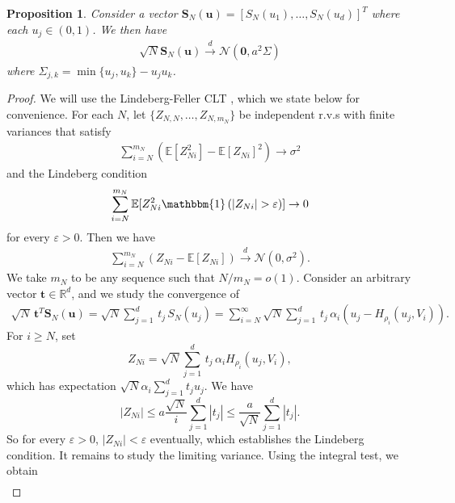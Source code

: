 \documentclass[11pt,a4paper]{article}
\newtheorem{prop}{Proposition}
\newcommand{\E}{\mathbb{E}}
\begin{document}
\begin{appendices}
\begin{prop}\label{app:prop_marginal}
    Consider a vector $\mathbf{S}_N(\mathbf{u}) = [S_N(u_1),\ldots,S_N(u_d)]^T$ where each $u_j \in (0,1)$. We then have
\begin{align*}
    \sqrt{N} \mathbf{S}_N(\mathbf{u}) \overset{d}{\to} \mathcal{N}(\mathbf{0}, a^2 \Sigma)
\end{align*}
where $   \Sigma_{j,k} = \min\{u_j,u_k\} - u_j u_k$.
\end{prop}
\begin{proof}
We will use the Lindeberg-Feller CLT \cite[Proposition 2.27]{vanderVaart2000}, which we state below for convenience. For each $N$, let $\{Z_{N,N},\ldots,Z_{N,m_{N}}\}$ be independent r.v.s with finite variances that satisfy
\begin{align*}
    \sum_{i=N}^{m_{N}} \left(\E[Z_{Ni}^2]-\E[Z_{Ni}]^2\right) \to \sigma^2
\end{align*}
and the Lindeberg condition
\begin{align*}
    \sum_{i=N}^{m_{N}}\E[Z_{Ni}^2 \mathbbm{1}\left(|Z_{Ni} | > \varepsilon\right)] \to 0
\end{align*}
for every $\varepsilon > 0$. Then we have
\begin{align*}
    \sum_{i=N}^{m_{N}}(Z_{Ni} -\E[Z_{Ni}]) \overset{d}{\to} \mathcal{N}(0,\sigma^2).
\end{align*}
We take $m_{N}$ to be any sequence such that $N/m_{N} = o(1)$. Consider an arbitrary vector $\mathbf{t} \in \mathbb{R}^{d}$, and we study the convergence of
\begin{align*}
    \sqrt{N}\, \mathbf{t}^T \mathbf{S}_N(\mathbf{u})  = \sqrt{N}\sum_{j=1}^d \, t_j \, S_N(u_j) = \sum_{i=N}^{\infty}\sqrt{N}\sum_{j=1}^d \, t_j \, \alpha_i(u_{j} - H_{\rho_i}(u_{j},V_i)).
\end{align*}
For $i \geq N$, set
\begin{equation*}
    Z_{Ni} = \sqrt{N}\sum_{j=1}^d \, t_j \, \alpha_i H_{\rho_i}(u_{j},V_i),
\end{equation*}
which has expectation $\sqrt{N}\alpha_{i}\sum_{j=1}^{d}t_{j}u_{j}$. We have
\begin{equation*}
     |Z_{Ni}| \leq a\frac{\sqrt{N}}{i}\sum_{j=1}^d  |t_j | \leq \frac{a}{\sqrt{N}}\sum_{j=1}^d  |t_j |.
\end{equation*}
So for every $\varepsilon > 0$, $|Z_{Ni}| <\varepsilon$ eventually, which establishes the Lindeberg condition. It remains to study the limiting variance. Using the integral test, we obtain
\begin{align*}

\end{align*}
\end{proof}
\end{appendices}
\end{document}
